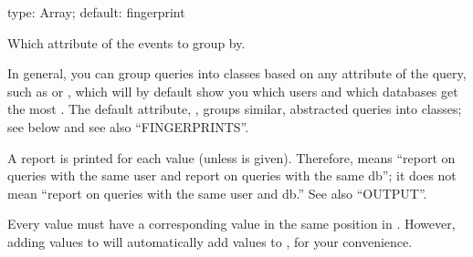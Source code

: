 \documentclass[letterpaper,10pt,english]{sphinxmanual}
\begin{document}

\begin{fulllineitems}
\label{\detokenize{mariadb-query-digest:cmdoption-mariadb-query-digest-group-by}}
\sphinxAtStartPar
type: Array; default: fingerprint

\sphinxAtStartPar
Which attribute of the events to group by.

\sphinxAtStartPar
In general, you can group queries into classes based on any attribute of the
query, such as  or , which will by default show you which users
and which databases get the most .  The default attribute,
, groups similar, abstracted queries into classes; see below
and see also “FINGERPRINTS”.

\sphinxAtStartPar
A report is printed for each {\hyperref[\detokenize{mariadb-query-digest:cmdoption-mariadb-query-digest-group-by}]{}} value (unless  is
given).  Therefore,  means “report on queries with the
same user and report on queries with the same db”; it does not mean “report
on queries with the same user and db.”  See also “OUTPUT”.

\sphinxAtStartPar
Every value must have a corresponding value in the same position in
{\hyperref[\detokenize{mariadb-query-digest:cmdoption-mariadb-query-digest-order-by}]{}}.  However, adding values to {\hyperref[\detokenize{mariadb-query-digest:cmdoption-mariadb-query-digest-group-by}]{}} will automatically
add values to {\hyperref[\detokenize{mariadb-query-digest:cmdoption-mariadb-query-digest-order-by}]{}}, for your convenience.


\end{fulllineitems}
\end{document}
